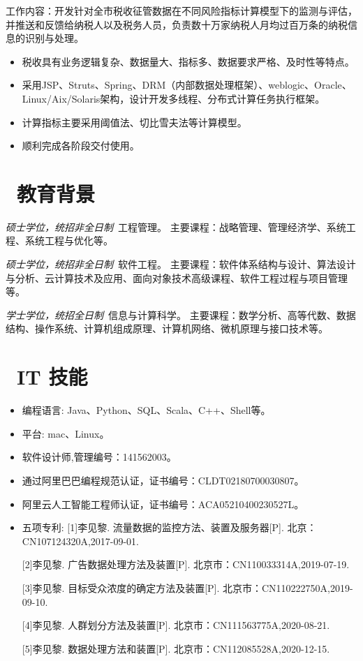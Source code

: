 \documentclass{resume}
\begin{document}
\begin{onehalfspacing}
工作内容：开发针对全市税收征管数据在不同风险指标计算模型下的监测与评估，并推送和反馈给纳税人以及税务人员，负责数十万家纳税人月均过百万条的纳税信息的识别与处理。
\begin{itemize}
  \item 税收具有业务逻辑复杂、数据量大、指标多、数据要求严格、及时性等特点。
  \item 采用JSP、Struts、Spring、DRM（内部数据处理框架）、weblogic、Oracle、Linux/Aix/Solaris架构，设计开发多线程、分布式计算任务执行框架。
  \item 计算指标主要采用阈值法、切比雪夫法等计算模型。
  \item 顺利完成各阶段交付使用。
\end{itemize}
\end{onehalfspacing}


\section{\faGraduationCap\  教育背景}
\textit{硕士学位，统招非全日制}\ 工程管理。
 主要课程：战略管理、管理经济学、系统工程、系统工程与优化等。
 
\textit{硕士学位，统招非全日制}\ 软件工程。
 主要课程：软件体系结构与设计、算法设计与分析、云计算技术及应用、面向对象技术高级课程、软件工程过程与项目管理等。

\textit{学士学位，统招全日制}\ 信息与计算科学。
 主要课程：数学分析、高等代数、数据结构、操作系统、计算机组成原理、计算机网络、微机原理与接口技术等。



\section{\faCogs\ IT 技能}
\begin{itemize}[parsep=0.5ex]
  \item 编程语言: Java、Python、SQL、Scala、C++、Shell等。
  \item 平台: mac、Linux。
  \item 软件设计师,管理编号：141562003。
  \item 通过阿里巴巴编程规范认证，证书编号：CLDT02180700030807。
 \item 阿里云人工智能工程师认证，证书编号：ACA05210400230527L。
  \item 五项专利:
[1]李见黎. 流量数据的监控方法、装置及服务器[P]. 北京：CN107124320A,2017-09-01.

[2]李见黎. 广告数据处理方法及装置[P]. 北京市：CN110033314A,2019-07-19.

[3]李见黎. 目标受众浓度的确定方法及装置[P]. 北京市：CN110222750A,2019-09-10.

[4]李见黎. 人群划分方法及装置[P]. 北京市：CN111563775A,2020-08-21.

[5]李见黎. 数据处理方法和装置[P]. 北京市：CN112085528A,2020-12-15.
\end{itemize}
\end{document}
